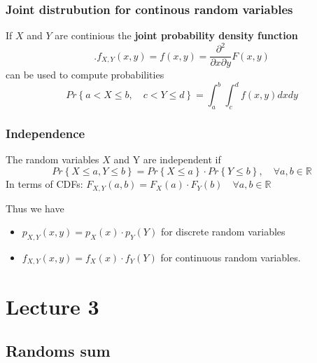 \documentclass{article}
\theoremstyle{remark}
\begin{document}
\subsubsection{Joint distrubution for continous random variables}%
\label{ssub:joint_distrobution_for_continous_random_variables}

If $X$ and $Y$ are continious the \textbf{joint probability density function}  \[
.f_{X,Y} \left( x,y \right) = f\left( x,y \right) = \frac{\partial ^2}{\partial x \partial y } F\left( x,y \right)
\]  can be used to compute probabilities \[
Pr\left\{ a < X \le b,  \quad  c < Y \le d  \right\} = \int_{a}^{b} \int_{c}^{d} f\left( x,y \right)dxdy
\]

\subsubsection{Independence}%
\label{ssub:independence_3}

The random variables $X$ and Y are independent if \[
Pr\left\{ X \le a , Y \le b \right\} =  Pr\left\{ X \le a \right\} \cdot  Pr\left\{ Y \le b \right\}, \quad  \forall a,b \in  \mathbb{R}
\]
In terms of CDFs:  $F_{X,Y}(a,b ) =  F_{X}\left( a \right)\cdot F_{Y}\left( b \right) \quad  \forall a,b \in \mathbb{R}  $
\par
Thus we have
\begin{itemize}
  \item $p_{X,Y} \left( x,y \right) = p_{X}\left( x \right) \cdot  p_{Y}\left( Y \right)$ for discrete random variables
  \item $f_{X,Y}\left( x,y \right) = f_{X}\left( x \right) \cdot  f_{Y}\left( Y \right)$ for continuous random variables.
\end{itemize}












\newpage
\section{Lecture 3}%
\label{sec:lecture_3}

\subsection{Randoms sum}%
\label{sub:randoms_sum}
\end{document}

